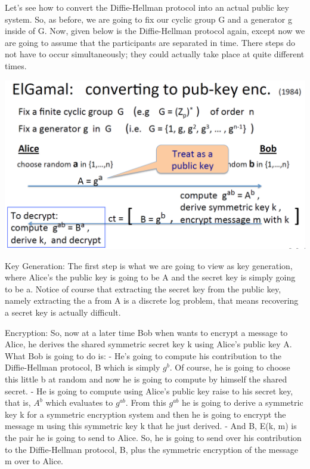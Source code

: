 \documentclass[11pt]{article}
\makeatletter
\def\maxwidth{\ifdim\Gin@nat@width>\linewidth\linewidth
    \else\Gin@nat@width\fi}
\let\Oldincludegraphics\includegraphics
\renewcommand{\includegraphics}[1]{\Oldincludegraphics[width=.8\maxwidth]{#1}}
\makeatother
\begin{document}
Let's see how to convert the Diffie-Hellman protocol into an actual
public key system. So, as before, we are going to fix our cyclic group G
and a generator g inside of G. Now, given below is the Diffie-Hellman
protocol again, except now we are going to assume that the participants
are separated in time. There steps do not have to occur simultaneously;
they could actually take place at quite different times.

\includegraphics{./Images/ElGamal-Intution.png}

Key Generation: The first step is what we are going to view as key
generation, where Alice's the public key is going to be A and the secret
key is simply going to be a. Notice of course that extracting the secret
key from the public key, namely extracting the a from A is a discrete
log problem, that means recovering a secret key is actually difficult.

Encryption: So, now at a later time Bob when wants to encrypt a message
to Alice, he derives the shared symmetric secret key k using Alice's
public key A. What Bob is going to do is: - He's going to compute his
contribution to the Diffie-Hellman protocol, B which is simply
\(g^{b}\). Of course, he is going to choose this little b at random and
now he is going to compute by himself the shared secret. - He is going
to compute using Alice's public key raise to his secret key, that is,
\(A^{b}\) which evaluates to \(g^{ab}\). From this \(g^{ab}\) he is
going to derive a symmetric key k for a symmetric encryption system and
then he is going to encrypt the message m using this symmetric key k
that he just derived. - And B, E(k, m) is the pair he is going to send
to Alice. So, he is going to send over his contribution to the
Diffie-Hellman protocol, B, plus the symmetric encryption of the message
m over to Alice.
\end{document}
